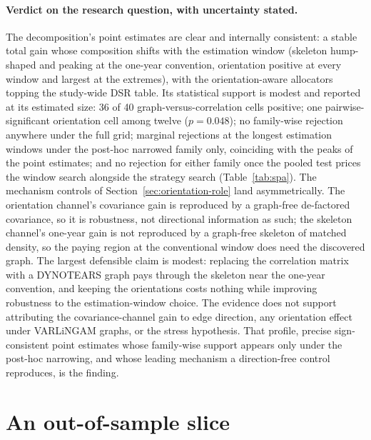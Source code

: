 \paragraph{Verdict on the research question, with uncertainty stated.} The decomposition's
point estimates are clear and internally consistent: a stable total
gain whose composition shifts with the estimation window (skeleton hump-shaped and
peaking at the one-year convention, orientation positive at every window
and largest at the extremes), with the orientation-aware allocators
topping the study-wide DSR table. Its statistical support is
modest and reported at its estimated size: 36 of 40
graph-versus-correlation cells
positive; one pairwise-significant orientation cell among twelve
($p=0.048$); no family-wise rejection
anywhere under the full grid; marginal rejections at the longest
estimation windows under the post-hoc narrowed family only, coinciding
with the peaks of the point estimates; and no rejection for either
family once the pooled test
prices the window search alongside the strategy search
(Table~\ref{tab:spa}). The mechanism controls of
Section~\ref{sec:orientation-role} land asymmetrically. The
orientation channel's covariance gain is
reproduced by a graph-free de-factored covariance, so it is
robustness, not directional information as such; the skeleton
channel's one-year gain is not reproduced by a graph-free skeleton of
matched density, so the paying region at the conventional window does
need the discovered graph. The
largest defensible claim is modest: replacing the correlation
matrix with a DYNOTEARS graph pays through the skeleton near the
one-year convention, and keeping the orientations costs nothing while
improving robustness to the estimation-window choice. The evidence
does not support attributing the covariance-channel gain to edge
direction, any orientation effect under VARLiNGAM graphs, or the
stress hypothesis. That profile, precise sign-consistent point
estimates whose family-wise support appears only under the post-hoc
narrowing, and whose leading mechanism a direction-free control
reproduces, is the finding.

\section{An out-of-sample slice}
\label{sec:oos}

